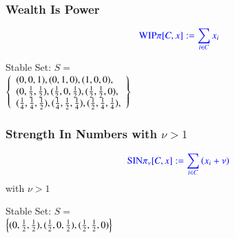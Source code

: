 \documentclass{beamer}
\def\mcolor#1#2{\rule{0ex}{0ex}\color{#1}#2\color{black}{}}
\begin{document}
\begin{frame}
  \frametitle{Wealth Is Power}
\begin{minipage}{0.5\textwidth}
\[\mcolor{blue}{\text{WIP}\pi[C,x]:=\sum _{i\in C} x_i}\]
\end{minipage}
\begin{minipage}{0.45\textwidth}
  \begin{center}
  
  \end{center}
\end{minipage}

\vspace*{-1cm}
\begin{minipage}[b]{0.45\textwidth}
Stable Set: $S=$ \\$\left\{\begin{array}{ll}(0,0,1),(0,1,0),(1,0,0),\\(0,{1\over 2},{1\over 2}),({1\over 2},0,{1\over 2}),({1\over 2},{1\over 2},0),\\
({1\over 4},{1\over 4},{1\over 2}),({1\over 4},{1\over 2},{1\over 4}),({1\over 2},{1\over 4},{1\over 4}), \end{array}\right\}$
\end{minipage}

\end{frame}



\begin{frame}
  \frametitle{Strength In Numbers with $\nu > 1$}
\begin{minipage}{0.5\textwidth}
\[\mcolor{blue}{\text{SIN}\pi_\nu[C,x]:=\sum _{i\in C} \left(x_i+\nu \right)}\]
\hspace*{5ex} with \(\nu>1\)
\end{minipage}\pause
\begin{minipage}{0.45\textwidth}
  \begin{center}
   
  \end{center}
\end{minipage}\pause

\vspace*{-1cm}
\begin{minipage}[b]{0.45\textwidth}
Stable Set: $S=$\\
$\left\{(0,{1\over 2},{1\over 2}), ({1\over 2},0,{1\over 2}), 
         ({1\over 2},{1\over 2},0)\right\}$
\end{minipage}

\end{frame}
\end{document}
